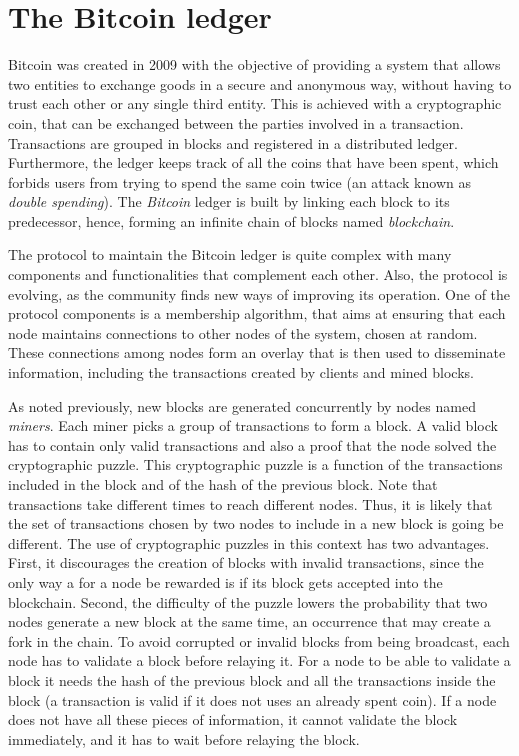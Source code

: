 \documentclass{dads}   %
\begin{document}
\section{The {\secit Bitcoin} ledger}

Bitcoin was created in 2009 with the objective of providing a system that allows two entities to exchange goods in a secure and anonymous way, without having to trust each other or any single third entity. This is achieved with a cryptographic coin, that can be exchanged between the parties involved in a transaction. Transactions are grouped in blocks and registered in a distributed ledger. Furthermore, the ledger keeps track of all the coins that have been spent, which forbids users from trying to spend the same coin twice (an attack known as \textit{double spending}). The \textit{Bitcoin} ledger is built by linking each block to its predecessor, hence, forming an infinite chain of blocks named \textit{blockchain}.

The protocol to maintain the Bitcoin ledger is quite complex with many components and functionalities that complement each other. Also, the protocol is evolving, as the community finds new ways of improving its operation. One of the protocol components is a membership algorithm,  that aims at ensuring that each node maintains connections to other nodes of the system, chosen at random. These connections among nodes form an overlay that is then used to disseminate information, including the transactions created by clients and mined blocks.

As noted previously, new blocks are generated concurrently by nodes named \textsl{miners}. Each miner picks a group of transactions to form a block. A valid block has to contain only valid transactions and also a proof that the node solved the cryptographic puzzle. This cryptographic puzzle is a function of the transactions included in the block and of the hash of the previous block. Note that transactions take different times to reach different nodes. Thus, it is likely that the set of transactions chosen by two nodes to include in a new block is going be different. 
The use of cryptographic puzzles in this context has two advantages. First, it discourages the creation of blocks with invalid transactions, since the only way a for a node be rewarded is if its block gets accepted into the blockchain. Second, the difficulty of the puzzle lowers the probability that two nodes generate a new block at the same time, an occurrence that may create a fork in the chain.  To avoid corrupted or invalid blocks from being broadcast, each node has to validate a block before relaying it. For a node to be able to validate a block it needs the hash of the previous block and all the transactions inside the block (a transaction is valid if it does not uses an already spent coin).  If a node does not have all these pieces of information, it cannot validate the block immediately, and it has to wait before relaying the block.
\end{document}
